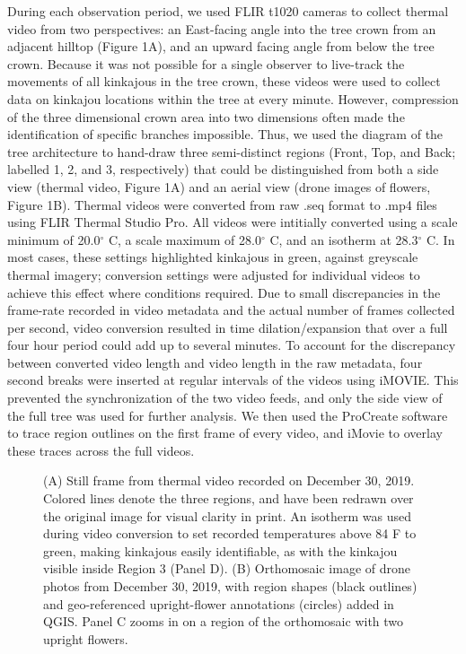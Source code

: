 \documentclass[twoside,12pt,final]{ucthesis-CA2012}
\begin{document}
\begin{ucmainmatter}
During each observation period, we used FLIR t1020 cameras to collect thermal video from two perspectives: an East-facing angle into the tree crown from an adjacent hilltop (Figure 1A), and an upward facing angle from below the tree crown. Because it was not possible for a single observer to live-track the movements of all kinkajous in the tree crown, these videos were used to collect data on kinkajou locations within the tree at every minute. However, compression of the three dimensional crown area into two dimensions often made the identification of specific branches impossible. Thus, we used the diagram of the tree architecture to hand-draw three semi-distinct regions (Front, Top, and Back; labelled 1, 2, and 3, respectively) that could be distinguished from both a side view (thermal video, Figure 1A) and an aerial view (drone images of flowers, Figure 1B). Thermal videos were converted from raw .seq format to .mp4 files using FLIR Thermal Studio Pro. All videos were intitially converted using a scale minimum of 20.0\(^\circ\) C, a scale maximum of 28.0\(^\circ\) C, and an isotherm at 28.3\(^\circ\) C. In most cases, these settings highlighted kinkajous in green, against greyscale thermal imagery; conversion settings were adjusted for individual videos to achieve this effect where conditions required. Due to small discrepancies in the frame-rate recorded in video metadata and the actual number of frames collected per second, video conversion resulted in time dilation/expansion that over a full four hour period could add up to several minutes. To account for the discrepancy between converted video length and video length in the raw metadata, four second breaks were inserted at regular intervals of the videos using iMOVIE. This prevented the synchronization of the two video feeds, and only the side view of the full tree was used for further analysis. We then used the ProCreate software to trace region outlines on the first frame of every video, and iMovie to overlay these traces across the full videos.
\begin{figure}[htbp]
\centering
\setlength{\fboxsep}{0pt}
\setlength{\fboxrule}{1pt}
\caption[Data collection methods]{ (A) Still frame from thermal video recorded on December 30, 2019. Colored lines denote the three regions, and have been redrawn over the original image for visual clarity in print. An isotherm was used during video conversion to set recorded temperatures above 84 F to green, making kinkajous easily identifiable, as with the kinkajou visible inside Region 3 (Panel D). (B) Orthomosaic image of drone photos from December 30, 2019, with region shapes (black outlines) and geo-referenced upright-flower annotations (circles) added in QGIS. Panel C zooms in on a region of the orthomosaic with two upright flowers.
}
\end{figure}
\end{ucmainmatter}
\end{document}
